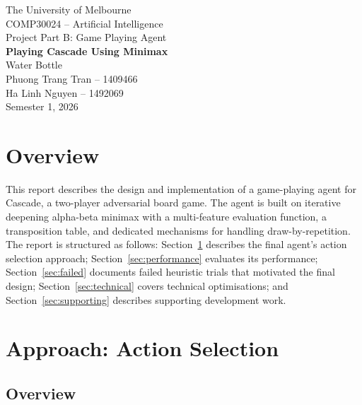 \documentclass[10pt,a4paper]{article}
\begin{document}
\begin{titlepage}
    \centering
    \vspace*{2cm}

    {\large The University of Melbourne}\\[0.5em]
    {\large COMP30024 -- Artificial Intelligence}\\[0.5em]
    {\large Project Part B: Game Playing Agent}\\[2cm]

    {\LARGE\bfseries Playing Cascade Using Minimax}\\[2cm]

    {\large Water Bottle}\\[0.5em]
    {\normalsize
        Phuong Trang Tran -- 1409466\\
        Ha Linh Nguyen -- 1492069
    }\\[3cm]

    {\normalsize Semester 1, 2026}

    \vfill
\end{titlepage}

\section*{Overview}

This report describes the design and implementation of a game-playing agent for Cascade, a two-player adversarial board game. The agent is built on iterative deepening alpha-beta minimax with a multi-feature evaluation function, a transposition table, and dedicated mechanisms for handling draw-by-repetition. The report is structured as follows: Section~\ref{sec:approach} describes the final agent's action selection approach; Section~\ref{sec:performance} evaluates its performance; Section~\ref{sec:failed} documents failed heuristic trials that motivated the final design; Section~\ref{sec:technical} covers technical optimisations; and Section~\ref{sec:supporting} describes supporting development work.

\section{Approach: Action Selection}
\label{sec:approach}

\subsection{Overview}
\end{document}
